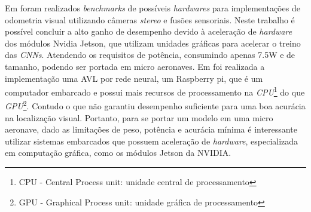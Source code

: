 Em \cite{jeon2021run} foram realizados \textit{benchmarks} de possíveis \textit{hardwares} para implementações de odometria visual utilizando câmeras \textit{stereo} e fusões sensoriais. Neste trabalho é possível concluir a alto ganho de desempenho devido à aceleração de \textit{hardware} dos módulos Nvidia Jetson, que utilizam unidades gráficas para acelerar o treino das \textit{CNNs}. Atendendo os requisitos de potência, consumindo apenas 7.5W e de tamanho, podendo ser portada em micro aeronaves.  Em \cite{Shiguemori2016Embedded} foi realizada a implementação uma AVL por rede neural, um Raspberry pi, que é um computador embarcado e possui mais recursos de processamento na \textit{CPU}\footnote{CPU - Central Process unit: unidade central de processamento} do que \textit{GPU}\footnote{GPU - Graphical Process unit: unidade gráfica de processamento}. Contudo  o que não garantiu desempenho suficiente para uma boa acurácia na localização visual. Portanto, para se portar um modelo em uma micro aeronave, dado as limitações de peso, potência e acurácia mínima é interessante utilizar sistemas embarcados que possuem aceleração de \textit{hardware}, especializada em computação gráfica, como os módulos Jetson da NVIDIA.



